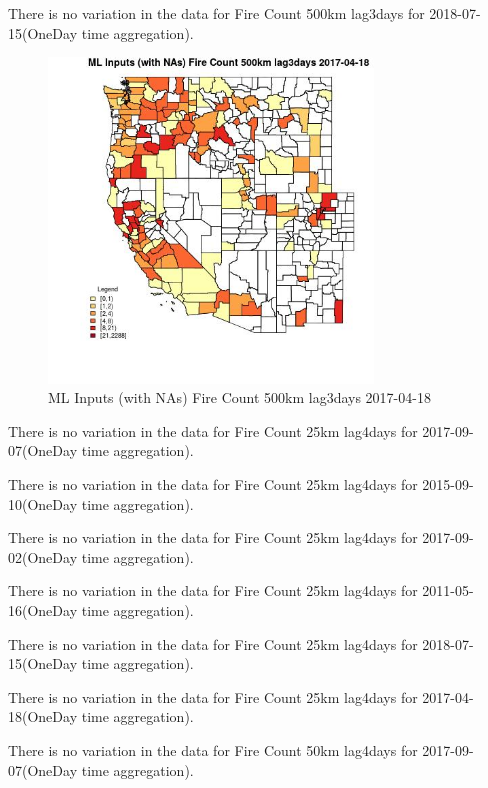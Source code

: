 There is no variation in the data for Fire Count 500km lag3days for 2018-07-15(OneDay time aggregation). 
 

\begin{figure} 
\centering  
\includegraphics[width=0.77\textwidth]{Code_Outputs/Report_ML_input_PM25_Step4_part_e_de_duplicated_aves_compiled_2019-05-21wNAs_CountyFire_Count_500km_lag3daysMean2017-04-18.jpg} 
\caption{\label{fig:Report_ML_input_PM25_Step4_part_e_de_duplicated_aves_compiled_2019-05-21wNAsCountyFire_Count_500km_lag3daysMean2017-04-18}ML Inputs (with NAs) Fire Count 500km lag3days 2017-04-18} 
\end{figure} 
 

There is no variation in the data for Fire Count 25km lag4days for 2017-09-07(OneDay time aggregation). 
 

There is no variation in the data for Fire Count 25km lag4days for 2015-09-10(OneDay time aggregation). 
 

There is no variation in the data for Fire Count 25km lag4days for 2017-09-02(OneDay time aggregation). 
 

There is no variation in the data for Fire Count 25km lag4days for 2011-05-16(OneDay time aggregation). 
 

There is no variation in the data for Fire Count 25km lag4days for 2018-07-15(OneDay time aggregation). 
 

There is no variation in the data for Fire Count 25km lag4days for 2017-04-18(OneDay time aggregation). 
 

There is no variation in the data for Fire Count 50km lag4days for 2017-09-07(OneDay time aggregation). 
 

